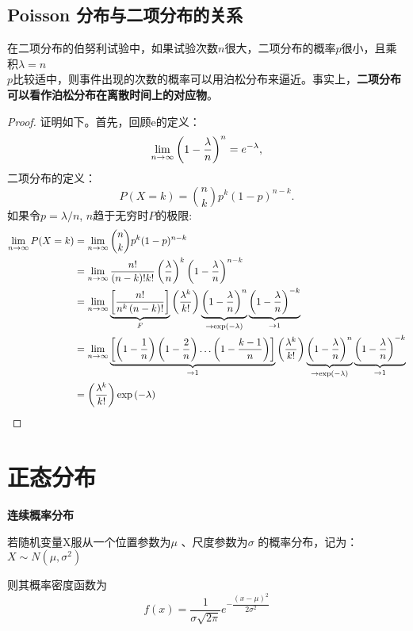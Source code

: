 \documentclass[openany]{book}
\begin{document}
\subsection{Poisson 分布与二项分布的关系}
在二项分布的伯努利试验中，如果试验次数$n$很大，二项分布的概率$p$很小，且乘积$\lambda = n$ \\$p$比较适中，则事件出现的次数的概率可以用泊松分布来逼近。事实上，\textbf{二项分布可以看作泊松分布在离散时间上的对应物}。
\begin{proof}
证明如下。首先，回顾e的定义：
$$
\lim _{{n\to \infty }}\left(1-{\lambda  \over n}\right)^{n}=e^{{-\lambda }},
$$
二项分布的定义：
$$
P(X=k)={n \choose k}p^{k}(1-p)^{{n-k}}.
$$
如果令$p=\lambda /n$, $n$趋于无穷时$P$的极限:
$$
\begin{aligned}
\lim_{{n \to \infty }}P(X=k) & =\lim _{{n\to \infty }}{n \choose k}p^{k}(1-p)^{{n-k}}\\
& = \lim _{{n\to \infty }}{n! \over (n-k)!k!}\left({\lambda \over n}\right)^{k}\left(1-{\lambda \over n}\right)^{{n-k}}\\
& = \lim _{{n\to \infty }}\underbrace {\left[{\frac {n!}{n^{k}\left(n-k\right)!}}\right]}_{F}\left({\frac {\lambda ^{k}}{k!}}\right)\underbrace {\left(1-{\frac {\lambda }{n}}\right)^{n}}_{{\to \exp \left(-\lambda \right)}}\underbrace {\left(1-{\frac {\lambda }{n}}\right)^{{-k}}}_{{\to 1}}\\
& = \lim _{{n\to \infty }}\underbrace {\left[\left(1-{\frac {1}{n}}\right)\left(1-{\frac {2}{n}}\right)\ldots \left(1-{\frac {k-1}{n}}\right)\right]}_{{\to 1}}\left({\frac {\lambda ^{k}}{k!}}\right)\underbrace {\left(1-{\frac {\lambda }{n}}\right)^{n}}_{{\to \exp \left(-\lambda \right)}}\underbrace {\left(1-{\frac {\lambda }{n}}\right)^{{-k}}}_{{\to 1}}\\
& = \left({\frac {\lambda ^{k}}{k!}}\right)\exp \left(-\lambda \right)
\end{aligned}
$$
\end{proof}

\section{正态分布}
\textbf{连续概率分布}

若随机变量X服从一个位置参数为$\mu$ 、尺度参数为$\sigma$ 的概率分布，记为：$X\sim N(\mu ,\sigma ^{2})$

则其概率密度函数为
$$f(x)=\frac{1}{\sigma {\sqrt  {2\pi }}} e^{{- \dfrac{(x-\mu )^{2}}{2\sigma ^{2}}}}$$
\end{document}
